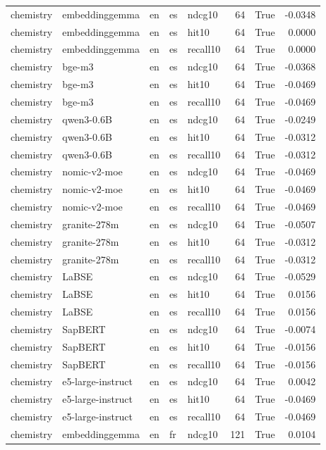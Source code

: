 \begin{tabular}{lllllrrr}
chemistry & embeddinggemma & en & es & ndcg10 & 64 & True & -0.0348 \\
chemistry & embeddinggemma & en & es & hit10 & 64 & True & 0.0000 \\
chemistry & embeddinggemma & en & es & recall10 & 64 & True & 0.0000 \\
chemistry & bge-m3 & en & es & ndcg10 & 64 & True & -0.0368 \\
chemistry & bge-m3 & en & es & hit10 & 64 & True & -0.0469 \\
chemistry & bge-m3 & en & es & recall10 & 64 & True & -0.0469 \\
chemistry & qwen3-0.6B & en & es & ndcg10 & 64 & True & -0.0249 \\
chemistry & qwen3-0.6B & en & es & hit10 & 64 & True & -0.0312 \\
chemistry & qwen3-0.6B & en & es & recall10 & 64 & True & -0.0312 \\
chemistry & nomic-v2-moe & en & es & ndcg10 & 64 & True & -0.0469 \\
chemistry & nomic-v2-moe & en & es & hit10 & 64 & True & -0.0469 \\
chemistry & nomic-v2-moe & en & es & recall10 & 64 & True & -0.0469 \\
chemistry & granite-278m & en & es & ndcg10 & 64 & True & -0.0507 \\
chemistry & granite-278m & en & es & hit10 & 64 & True & -0.0312 \\
chemistry & granite-278m & en & es & recall10 & 64 & True & -0.0312 \\
chemistry & LaBSE & en & es & ndcg10 & 64 & True & -0.0529 \\
chemistry & LaBSE & en & es & hit10 & 64 & True & 0.0156 \\
chemistry & LaBSE & en & es & recall10 & 64 & True & 0.0156 \\
chemistry & SapBERT & en & es & ndcg10 & 64 & True & -0.0074 \\
chemistry & SapBERT & en & es & hit10 & 64 & True & -0.0156 \\
chemistry & SapBERT & en & es & recall10 & 64 & True & -0.0156 \\
chemistry & e5-large-instruct & en & es & ndcg10 & 64 & True & 0.0042 \\
chemistry & e5-large-instruct & en & es & hit10 & 64 & True & -0.0469 \\
chemistry & e5-large-instruct & en & es & recall10 & 64 & True & -0.0469 \\
chemistry & embeddinggemma & en & fr & ndcg10 & 121 & True & 0.0104 \\

\end{tabular}
